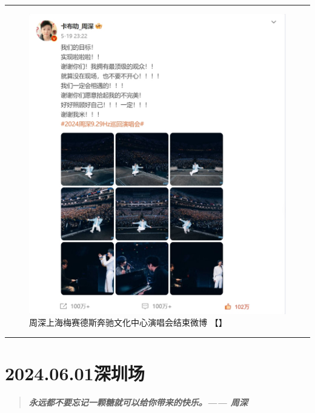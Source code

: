 \documentclass[]{ctexbook}
\begin{document}
\begin{center}\rule{0.5\linewidth}{0.5pt}\end{center}

\begin{figure}
\centering
\includegraphics{img/weibo/shanghai-20240519.png}
\caption{\label{fig:unnamed-chunk-37}周深上海梅赛德斯奔驰文化中心演唱会结束微博 【\citet{weibo-charlie}】}
\end{figure}

\begin{center}\rule{0.5\linewidth}{0.5pt}\end{center}

\chapter{2024.06.01深圳场}\label{shenzhen-20240601}

\begin{quote}
\textbf{\emph{永远都不要忘记一颗糖就可以给你带来的快乐。------ 周深}}
\end{quote}
\end{document}
